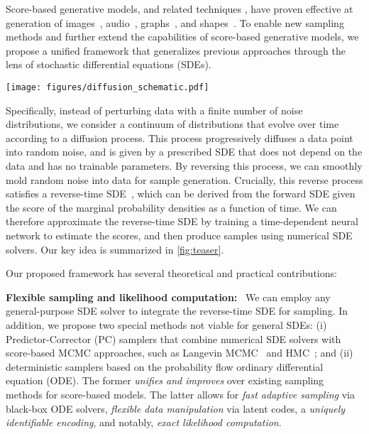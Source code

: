 \documentclass{article} \usepackage{iclr2021_conference,times}
\begin{document}
Score-based generative models, and related techniques \citep{bordes2017learning,goyal2017variational, du2019implicit}, have proven effective at generation of images~\citep{song2019generative,song2020improved,ho2020denoising}, audio~\citep{chen2020wavegrad,kong2020diffwave}, graphs~\citep{niu20a}, and shapes~\citep{ShapeGF}. To enable new sampling methods and further extend the capabilities of score-based generative models, we propose a unified framework that generalizes previous approaches through the lens of stochastic differential equations (SDEs).



\begin{SCfigure}
    \centering
    \caption{{\bf Solving a reverse-time SDE yields a score-based generative model.} Transforming data to a simple noise distribution can be accomplished with a continuous-time SDE. This SDE can be reversed if we know the score of the distribution at each intermediate time step, . }
    \texttt{[image: figures/diffusion\_schematic.pdf]}
    \label{fig:teaser}
\end{SCfigure}

Specifically, instead of perturbing data with a finite number of noise distributions, we consider a continuum of distributions that evolve over time according to a diffusion process. This process progressively diffuses a data point into random noise, and is given by a prescribed SDE that does not depend on the data and has no trainable parameters. 
By reversing this process, we can smoothly mold random noise into data for sample generation. Crucially, this reverse process satisfies a reverse-time SDE~\citep{Anderson1982-ny}, which can be derived from the forward SDE given the score of the marginal probability densities as a function of time. We can therefore approximate the reverse-time SDE by training a time-dependent neural network to estimate the scores, and then produce samples using numerical SDE solvers. Our key idea is summarized in \cref{fig:teaser}.

Our proposed framework has several theoretical and practical contributions: 

\textbf{Flexible sampling and likelihood computation:}~ We can employ any general-purpose SDE solver to integrate the reverse-time SDE for sampling. In addition, we propose two special methods not viable for general SDEs: (i) Predictor-Corrector (PC) samplers that combine numerical SDE solvers with score-based MCMC approaches, such as Langevin MCMC~\citep{parisi1981correlation} and HMC~\citep{neal2011mcmc}; and (ii) deterministic samplers based on the probability flow ordinary differential equation (ODE). The former \emph{unifies and improves} over existing sampling methods for score-based models. The latter allows for \emph{fast adaptive sampling} via black-box ODE solvers, \emph{flexible data manipulation} via latent codes, a \emph{uniquely identifiable encoding}, and notably, \emph{exact likelihood computation}.
\end{document}
